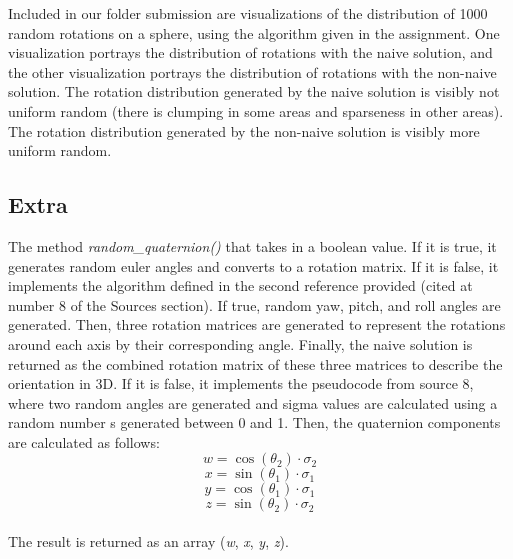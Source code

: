 \documentclass{article}
\begin{document}
\begin{enumerate}
Included in our folder submission are visualizations of the distribution of 1000 random rotations on a sphere, using the algorithm given in the assignment. One visualization portrays the distribution of rotations with the naive solution, and the other visualization portrays the distribution of rotations with the non-naive solution. The rotation distribution generated by the naive solution is visibly not uniform random (there is clumping in some areas and sparseness in other areas). The rotation distribution generated by the non-naive solution is visibly more uniform random.
\end{enumerate}

\subsection{Extra}
\hspace{\parindent}The method \textit{random\_quaternion()} that takes in a boolean value. If it is true, it generates random euler angles and converts to a rotation matrix. If it is false, it implements the algorithm defined in the second reference provided (cited at number 8 of the Sources section). If true, random yaw, pitch, and roll angles are generated. Then, three rotation matrices are generated to represent the rotations around each axis by their corresponding angle. Finally, the naive solution is returned as the combined rotation matrix of these three matrices to describe the orientation in 3D. If it is false, it implements the pseudocode from source 8, where two random angles are generated and sigma values are calculated using a random number s generated between 0 and 1. Then, the quaternion components are calculated as follows:
\[w = \cos(\theta_2) \cdot \sigma_2\]
\[x = \sin(\theta_1) \cdot \sigma_1\]
\[y = \cos(\theta_1) \cdot \sigma_1\]
\[z = \sin(\theta_2) \cdot \sigma_2\]\\
The result is returned as an array (\textit{w}, \textit{x}, \textit{y}, \textit{z}).\par
\end{document}
